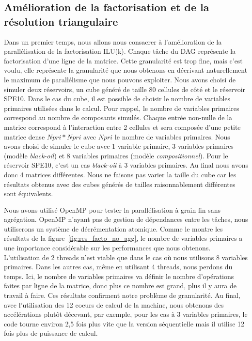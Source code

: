 \subsection{Amélioration de la factorisation et de la résolution triangulaire}
Dans un premier temps, nous allons nous consacrer à l'amélioration de la parallélisation de la factorisation ILU(k).
%
Chaque tâche du DAG représente la factorisation d'une ligne de la matrice.
%
Cette granularité est trop fine, mais c'est voulu, elle représente la granularité que nous obtenons en décrivant naturellement le maximum  de parallélisme que nous pouvons exploiter.
%
Nous avons choisi de simuler deux réservoirs, un cube généré de taille 80 cellules de côté et le réservoir SPE10.
%
Dans le cas du cube, il est possible de choisir le nombre de variables primaires utilisées dans le calcul.
%
Pour rappel, le nombre de variables primaires correspond au nombre de composants simulés.
%
Chaque entrée non-nulle de la matrice correspond à l'interaction entre 2 cellules et sera composée d'une petite matrice dense $Npri*Npri$ avec $Npri$ le nombre de variables primaires.
%
Nous avons choisi de simuler le cube avec 1 variable primaire, 3 variables primaires (modèle {\em black-oil}) et 8 variables primaires (modèle {\em compositionnel}).
%
Pour le réservoir SPE10, c'est un cas {\em black-oil} à 3 variables primaires.
%
Au final nous avons donc 4 matrices différentes.
%
Nous ne faisons pas varier la taille du cube car les résultats obtenus avec des cubes générés de tailles raisonnablement différentes sont équivalents.


Nous avons utilisé OpenMP pour tester la parallélisation à grain fin sans agrégation.
%
OpenMP n'ayant pas de gestion de dépendances entre les tâches, nous utiliserons un système de décrémentation atomique.
%
Comme le montre les résultats de la figure~\ref{fig:res_facto_no_agg}, le nombre de variables primaires a une importance considérable sur les performances que nous obtenons.
%
L'utilisation de 2 threads n'est viable que dans le cas où nous utilisons 8 variables primaires.
%
Dans les autres cas, même en utilisant 4 threads, nous perdons du temps.
%
Ici, le nombre de variables primaires va définir le nombre d'opérations faites par ligne de la matrice, donc plus ce nombre est grand, plus il y aura de travail à faire.
%
Ces résultats confirment notre problème de granularité.
%
Au final, avec l'utilisation des 12 coeurs de calcul de la machine, nous obtenons des accélérations plutôt décevant, par exemple, pour les cas à 3 variables primaires, le code tourne environ 2,5 fois plus vite que la version séquentielle mais il utilise 12 fois plus de puissance de calcul.



